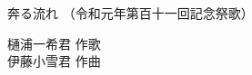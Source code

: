 \documentclass[10pt,b5j]{tarticle} %
\begin{document}
\begin{minipage}[c]{0.7\hsize} %
    \begin{center}
        {\LARGE
            奔る流れ %
        }
        {\small 
            （令和元年第百十一回記念祭歌） %
        }
    \end{center}
\end{minipage}
\begin{minipage}[c]{0.3\hsize} %
    \begin{flushright} %
        樋浦一希君 作歌\\伊藤小雪君 作曲 %
    \end{flushright}
\end{minipage}
\end{document}
